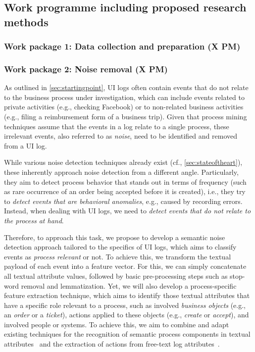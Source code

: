 \subsection{Work programme including proposed research methods}


\subsubsection{Work package 1: Data collection and preparation  (X PM)}
\label{sec:wp1}


\subsubsection{Work package 2:  Noise removal (X PM)}
\label{sec:wp2}

As outlined in \autoref{sec:startingpoint}, UI logs often contain events that do not relate to the business process under investigation, which can include events related to private activities (e.g., checking Facebook) or to non-related business activities (e.g., filing a reimbursement form of a business trip).
Given that process mining techniques assume that the events in a log relate to a single process, these irrelevant events, also referred to as \emph{noise}, need to be identified and removed from a UI log.

While various noise detection techniques already exist (cf., \autoref{sec:stateoftheart}), these  inherently approach noise detection from a different angle. Particularly, they aim to detect process behavior that stands out in terms of frequency (such as rare occurrence of an order being accepted before it is created), i.e., they try to \emph{detect events that are behavioral anomalies}, e.g., caused by recording errors.
Instead, when dealing with UI logs, we need to \emph{detect events that do not relate to the process at hand}. 

Therefore, to approach this task, we propose to develop a semantic noise detection approach tailored to the specifics of UI logs, which aims to classify events as \emph{process relevant} or not. 
To achieve this, we transform the textual payload of each event into a feature vector.
For this, we can simply concatenate all textual attribute values, followed by basic pre-processing steps such as stop-word removal and lemmatization. Yet, we will also develop a process-specific feature extraction technique, which aims to identify those textual attributes that have a specific role relevant to a process, such as involved \emph{business objects} (e.g., an \emph{order} or a \emph{ticket}), actions applied to these objects (e.g., \emph{create} or \emph{accept}), and involved people or systems. To achieve this, we aim to combine and adapt existing techniques for the recognition of semantic process components in textual attributes~\cite{rebmann2021extracting} and the extraction of actions from free-text log attributes~\cite{gupta2020analyzing}.


